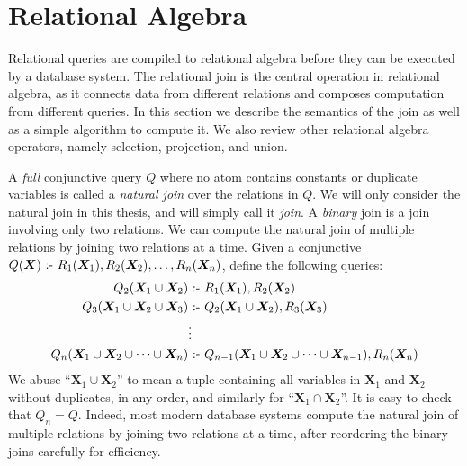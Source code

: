 \section{Relational Algebra}
\label{sec:join}

Relational queries are compiled to relational algebra 
 before they can be executed by a database system.
The relational join is the central operation in relational algebra,
 as it connects data from different relations 
 and composes computation from different queries.
In this section we describe the semantics of the join
 as well as a simple algorithm to compute it.
We also review other relational algebra operators,
 namely selection, projection, and union.

A {\em full} conjunctive query $Q$ where 
 no atom contains constants or duplicate variables
 is called a {\em natural join} over the relations in $Q$.
We will only consider the natural join in this thesis, 
 and will simply call it {\em join}.
A {\em binary} join is a join involving only two relations.
We can compute the natural join of multiple relations 
 by joining two relations at a time.
Given a conjunctive $Q(\bm{X}) \text{ :- } R_1(\bm{X}_1), R_2(\bm{X}_2), \ldots, R_n(\bm{X}_n)$,
 define the following queries:
\begin{align*}
Q_2({\bm X_1} \cup {\bm X_2}) &\text{ :- } R_1({\bm X_1}), R_2({\bm X_2})\\
Q_3({\bm X_1} \cup {\bm X_2} \cup {\bm X_3}) &\text{ :- } Q_2({\bm X_1} \cup {\bm X_2}), R_3({\bm X_3})\\
& \vdots \\
Q_n({\bm X_1} \cup {\bm X_2} \cup \cdots \cup {\bm X_n}) &\text{ :- } Q_{n-1}({\bm X_1} \cup {\bm X_2} \cup \cdots \cup {\bm X_{n-1}}), R_n({\bm X_n})
\end{align*}
We abuse ``${\bm X_1} \cup {\bm X_2}$'' to mean a tuple containing 
 all variables in ${\bm X_1}$ and ${\bm X_2}$ without duplicates, in any order, 
 and similarly for ``${\bm X_1} \cap {\bm X_2}$''.
It is easy to check that $Q_n = Q$. 
Indeed, most modern database systems compute the natural join of multiple relations 
 by joining two relations at a time, 
 after reordering the binary joins carefully for efficiency. 

